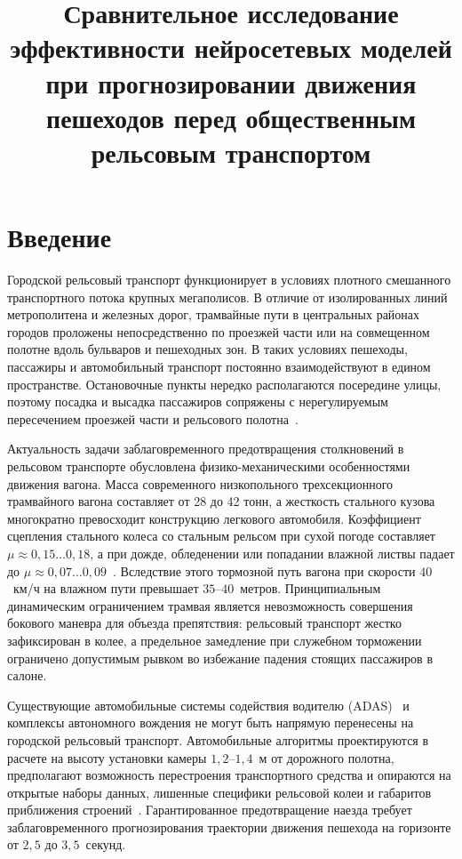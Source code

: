 \documentclass{misisarticle}
\title{Сравнительное исследование эффективности нейросетевых моделей при прогнозировании движения пешеходов перед общественным рельсовым транспортом}
\begin{document}
\maketitle

\section{Введение}

Городской рельсовый транспорт функционирует в условиях плотного смешанного транспортного потока крупных мегаполисов. В отличие от изолированных линий метрополитена и железных дорог, трамвайные пути в центральных районах городов проложены непосредственно по проезжей части или на совмещенном полотне вдоль бульваров и пешеходных зон. В таких условиях пешеходы, пассажиры и автомобильный транспорт постоянно взаимодействуют в едином пространстве. Остановочные пункты нередко располагаются посередине улицы, поэтому посадка и высадка пассажиров сопряжены с нерегулируемым пересечением проезжей части и рельсового полотна~\cite{kustenko2025}.

Актуальность задачи заблаговременного предотвращения столкновений в рельсовом транспорте обусловлена физико-механическими особенностями движения вагона. Масса современного низкопольного трехсекционного трамвайного вагона составляет от 28 до 42 тонн, а жесткость стального кузова многократно превосходит конструкцию легкового автомобиля. Коэффициент сцепления стального колеса со стальным рельсом при сухой погоде составляет $\mu \approx 0{,}15\dots0{,}18$, а при дожде, обледенении или попадании влажной листвы падает до $\mu \approx 0{,}07\dots0{,}09$~\cite{lewis2009}. Вследствие этого тормозной путь вагона при скорости $40$~км/ч на влажном пути превышает $35$--$40$~метров. Принципиальным динамическим ограничением трамвая является невозможность совершения бокового маневра для объезда препятствия: рельсовый транспорт жестко зафиксирован в колее, а предельное замедление при служебном торможении ограничено допустимым рывком во избежание падения стоящих пассажиров в салоне.

Существующие автомобильные системы содействия водителю (ADAS)~\cite{gost70249} и комплексы автономного вождения не могут быть напрямую перенесены на городской рельсовый транспорт. Автомобильные алгоритмы проектируются в расчете на высоту установки камеры $1{,}2$--$1{,}4$~м от дорожного полотна, предполагают возможность перестроения транспортного средства и опираются на открытые наборы данных, лишенные специфики рельсовой колеи и габаритов приближения строений~\cite{gost9238}. Гарантированное предотвращение наезда требует заблаговременного прогнозирования траектории движения пешехода на горизонте от $2{,}5$ до $3{,}5$~секунд.
\end{document}
